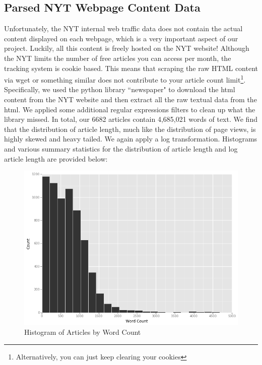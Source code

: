 \documentclass[fleqn,12pt]{SelfArx} %
\begin{document}
\subsection{Parsed NYT Webpage Content Data}
Unfortunately, the NYT internal web traffic data does not contain the actual content displayed on each webpage, which is a very important aspect of our project. Luckily, all this content is freely hosted on the NYT website! Although the NYT limits the number of free articles you can access per month, the tracking system is cookie based. This means that scraping the raw HTML content via wget or something similar does not contribute to your article count limit\footnote{Alternatively, you can just keep clearing your cookies}. Specifically, we used the python library ``newspaper" to download the html content from the NYT website and then extract all the raw textual data from the html. We applied some additional regular expressions filters to clean up what the library missed. In total, our 6682 articles contain 4,685,021 words of text.  We find that the distribution of article length, much like the distribution of page views, is highly skewed and heavy tailed. We again apply a log transformation. Histograms and various summary statistics for the distribution of article length and log article length are provided below:

\begin{figure}[ht]\centering
\includegraphics[width=\linewidth]{wordcount_hist}
\caption{Histogram of Articles by Word Count}
\label{fig:pv_hist}
\end{figure}
\end{document}
